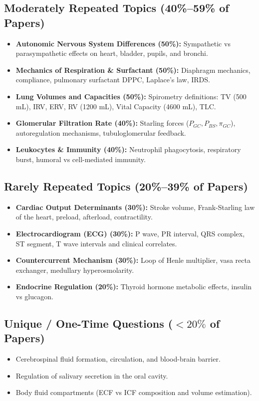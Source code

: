 \documentclass[11pt,a4paper]{article}
\begin{document}
\subsection{Moderately Repeated Topics (40\%--59\% of Papers)}
\begin{itemize}[leftmargin=*]
    \item \textbf{Autonomic Nervous System Differences (50\%):} Sympathetic vs parasympathetic effects on heart, bladder, pupils, and bronchi.
    \item \textbf{Mechanics of Respiration \& Surfactant (50\%):} Diaphragm mechanics, compliance, pulmonary surfactant DPPC, Laplace's law, IRDS.
    \item \textbf{Lung Volumes and Capacities (50\%):} Spirometry definitions: TV (500 mL), IRV, ERV, RV (1200 mL), Vital Capacity (4600 mL), TLC.
    \item \textbf{Glomerular Filtration Rate (40\%):} Starling forces ($P_{GC}, P_{BS}, \pi_{GC}$), autoregulation mechanisms, tubuloglomerular feedback.
    \item \textbf{Leukocytes \& Immunity (40\%):} Neutrophil phagocytosis, respiratory burst, humoral vs cell-mediated immunity.
\end{itemize}

\subsection{Rarely Repeated Topics (20\%--39\% of Papers)}
\begin{itemize}[leftmargin=*]
    \item \textbf{Cardiac Output Determinants (30\%):} Stroke volume, Frank-Starling law of the heart, preload, afterload, contractility.
    \item \textbf{Electrocardiogram (ECG) (30\%):} P wave, PR interval, QRS complex, ST segment, T wave intervals and clinical correlates.
    \item \textbf{Countercurrent Mechanism (30\%):} Loop of Henle multiplier, vasa recta exchanger, medullary hyperosmolarity.
    \item \textbf{Endocrine Regulation (20\%):} Thyroid hormone metabolic effects, insulin vs glucagon.
\end{itemize}

\subsection{Unique / One-Time Questions ($<20\%$ of Papers)}
\begin{itemize}[leftmargin=*]
    \item Cerebrospinal fluid formation, circulation, and blood-brain barrier.
    \item Regulation of salivary secretion in the oral cavity.
    \item Body fluid compartments (ECF vs ICF composition and volume estimation).
\end{itemize}
\end{document}
